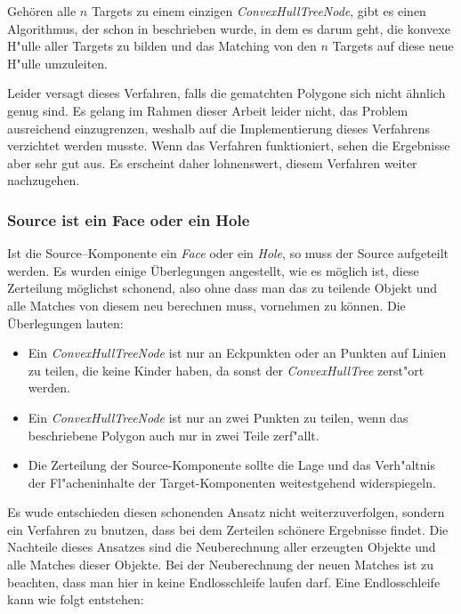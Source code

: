 Gehören alle $n$ Targets zu einem einzigen \textit{ConvexHullTreeNode}, gibt es einen Algorithmus, der schon in \cite{TG} beschrieben wurde, in dem es darum geht, die konvexe H"ulle aller Targets zu bilden und das Matching von den $n$ Targets auf diese neue H"ulle umzuleiten.

Leider versagt dieses Verfahren, falls die gematchten Polygone sich nicht ähnlich genug sind. Es gelang im Rahmen dieser Arbeit leider nicht, das Problem ausreichend einzugrenzen, weshalb auf die Implementierung dieses Verfahrens verzichtet werden musste. Wenn das Verfahren funktioniert, sehen die Ergebnisse aber sehr gut aus. Es erscheint daher lohnenswert, diesem Verfahren weiter nachzugehen.

\subsubsection*{Source ist ein Face oder ein Hole}

Ist die Source--Komponente ein \textit{Face} oder ein \textit{Hole},  so muss der Source aufgeteilt werden. Es wurden einige Überlegungen angestellt, wie es möglich ist, diese Zerteilung möglichst schonend, also ohne dass man das zu teilende Objekt und alle Matches von diesem neu berechnen muss, vornehmen zu können. Die Überlegungen lauten:
\begin{itemize}
\item Ein \textit{ConvexHullTreeNode} ist nur an Eckpunkten oder an Punkten auf Linien zu teilen, die keine Kinder haben, da sonst der \textit{ConvexHullTree} zerst"ort werden.

\item Ein \textit{ConvexHullTreeNode} ist nur an zwei Punkten zu teilen, wenn das beschriebene Polygon auch nur in zwei Teile zerf"allt.

\item Die Zerteilung der Source-Komponente sollte die Lage und das Verh"altnis der Fl"acheninhalte der Target-Komponenten weitestgehend widerspiegeln.

\end{itemize} 

Es wude entschieden diesen schonenden Ansatz nicht weiterzuverfolgen, sondern ein Verfahren zu bnutzen, dass bei dem Zerteilen schönere Ergebnisse findet. Die Nachteile dieses Ansatzes sind die Neuberechnung aller erzeugten Objekte und alle Matches dieser Objekte. Bei der Neuberechnung der neuen Matches ist zu beachten, dass man hier in keine Endlosschleife laufen darf. Eine Endlosschleife kann wie folgt entstehen:


